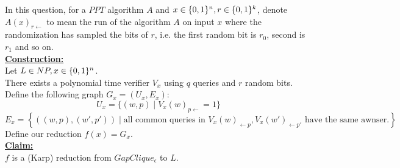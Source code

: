 In this question, for a $PPT$ algorithm $A$
and $x\in\{0,1\}^n,r\in\{0,1\}^k$,
denote $A(x)_{r\leftarrow}$
to mean the run of the algorithm $A$ on input $x$ where the randomization has sampled
the bits of $r$, i.e. the first random bit is $r_0$, second is $r_1$ and so on.\\

\underline{\textbf{Construction:}}\\
Let $L\in NP, x\in\{0,1\}^n$.\\
There exists a polynomial time verifier $V_x$ using $q$ queries and $r$ random bits.\\
Define the following graph $G_x=(U_x,E_x)$:
\[
    U_x=\{(w,p)\mid V_x(w)_{p\leftarrow}=1\}   
\]
\[
    E_x=\left\{
        ((w,p),(w',p'))\mid \text{all common queries in } V_x(w)_{\leftarrow p}, V_x(w')_{\leftarrow p'} \text{ have the same awnser.}
    \right\}    
\]
Define our reduction $f(x)=G_x$.\\

\underline{\textbf{Claim:}}\\
$f$ is a (Karp) reduction from $GapClique_\epsilon$ to $L$.\\

